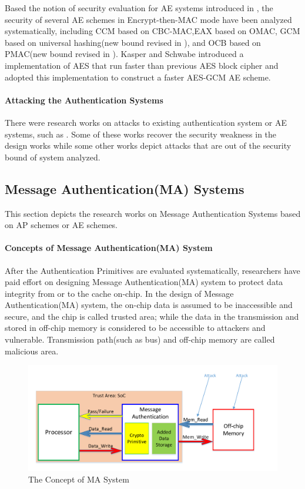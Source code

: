 \documentclass{article}
\begin{document}
Based the notion of security evaluation for AE systems introduced in \cite{aead}, the security of several AE schemes in
Encrypt-then-MAC mode have been analyzed systematically, including CCM \cite{ccm}based on
CBC-MAC,EAX\cite{eax} based on OMAC, GCM
\cite{gcm} based on universal hashing(new bound revised in \cite{breaking}), and
OCB\cite{ocb} based on PMAC(new bound revised in \cite{tweak,iPMAC}). Kasper and
Schwabe introduced a implementation of AES that run faster than previous AES block cipher
and adopted this implementation to construct a faster AES-GCM AE
scheme\cite{fast}.

\paragraph{Attacking the Authentication Systems}
There were research works on attacks to existing authentication system or AE systems, such as
\cite{cycle,attack_blk,hardware_attack}. Some of these works recover the security weakness in the design works while some other works depict attacks that are out of the security bound of system analyzed. 

\subsection{Message Authentication(MA) Systems}
This section depicts the research works on Message Authentication Systems based on AP schemes or AE schemes.
\paragraph{Concepts of Message Authentication(MA) System}
After the Authentication Primitives are evaluated systematically, researchers have paid effort on designing Message Authentication(MA) system to protect data integrity from or to the cache on-chip. 
In the design of Message Authentication(MA) system, the on-chip data is assumed to be inaccessible and secure, and the chip is called trusted area; while the data in the transmission and stored in off-chip memory is considered to be accessible to attackers and vulnerable. Transmission path(such as bus) and off-chip memory are called malicious area. 
\begin{figure}[htbp]
\centering
\includegraphics[scale=0.5]{./diagrams/MA_concept.pdf}
\caption{The Concept of MA System}
\label{ma_system}
\end{figure}
\end{document}
